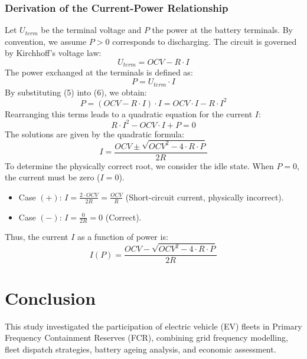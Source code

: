 \documentclass{article}
\begin{document}
\subsubsection{Derivation of the Current-Power Relationship}
Let $U_{term}$ be the terminal voltage and $P$ the power at the battery terminals. By convention, we assume $P>0$ corresponds to discharging. The circuit is governed by Kirchhoff's voltage law:
\begin{equation}
    U_{term} = OCV - R \cdot I
\end{equation}
The power exchanged at the terminals is defined as:
\begin{equation}
    P = U_{term} \cdot I
\end{equation}
By substituting (5) into (6), we obtain:
\begin{equation}
    P = (OCV - R \cdot I) \cdot I = OCV \cdot I - R \cdot I^2
\end{equation}
Rearranging this terms leads to a quadratic equation for the current $I$:
\begin{equation}
    R \cdot I^2 - OCV \cdot I + P = 0
\end{equation}
The solutions are given by the quadratic formula:
\begin{equation}
    I = \frac{OCV \pm \sqrt{OCV^2 - 4 \cdot R \cdot P}}{2R}
\end{equation}
To determine the physically correct root, we consider the idle state. When $P=0$, the current must be zero ($I=0$).
\begin{itemize}
    \item Case $(+)$: $I = \frac{2 \cdot OCV}{2R} = \frac{OCV}{R}$ (Short-circuit current, physically incorrect).
    \item Case $(-)$: $I = \frac{0}{2R} = 0$ (Correct).
\end{itemize}
Thus, the current $I$ as a function of power is:
\begin{equation}
    I(P) = \frac{OCV - \sqrt{OCV^2 - 4 \cdot R \cdot P}}{2R}
\end{equation}

\vspace{0.5em}
\section{Conclusion}
This study investigated the participation of electric vehicle (EV) fleets in Primary Frequency Containment Reserves (FCR), combining grid frequency modelling, fleet dispatch strategies, battery ageing analysis, and economic assessment.
\end{document}
